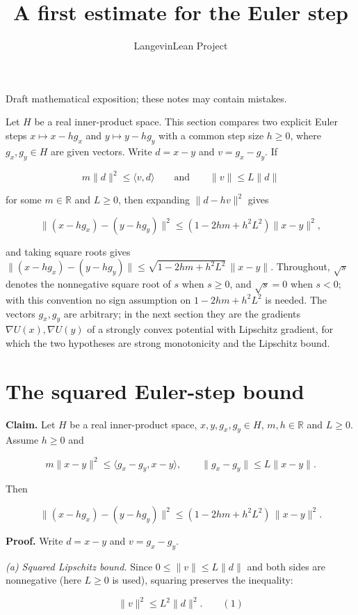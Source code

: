 \documentclass[11pt,a4paper]{article}
\title{\texorpdfstring{A first estimate for the Euler step}{A first estimate for the Euler step}}
\author{LangevinLean Project}
\date{}
\begin{document}
\maketitle
Draft mathematical exposition; these notes may contain mistakes.


Let \(H\) be a real inner-product space. This section compares two explicit Euler steps \(x\mapsto x-hg_x\) and \(y\mapsto y-hg_y\) with a common step size \(h\ge0\), where \(g_x,g_y\in H\) are given vectors. Write \(d=x-y\) and \(v=g_x-g_y\). If


\[m\|d\|^2\le\langle v,d\rangle\qquad\text{and}\qquad\|v\|\le L\|d\|\]


for some \(m\in\mathbb R\) and \(L\ge0\), then expanding \(\|d-hv\|^2\) gives


\[\|(x-hg_x)-(y-hg_y)\|^2\le(1-2hm+h^2L^2)\|x-y\|^2,\]


and taking square roots gives \(\|(x-hg_x)-(y-hg_y)\|\le\sqrt{1-2hm+h^2L^2}\,\|x-y\|\). Throughout, \(\sqrt s\) denotes the nonnegative square root of \(s\) when \(s\ge0\), and \(\sqrt s=0\) when \(s<0\); with this convention no sign assumption on \(1-2hm+h^2L^2\) is needed. The vectors \(g_x,g_y\) are arbitrary; in the next section they are the gradients \(\nabla U(x),\nabla U(y)\) of a strongly convex potential with Lipschitz gradient, for which the two hypotheses are strong monotonicity and the Lipschitz bound.


\section{\texorpdfstring{The squared Euler-step bound}{The squared Euler-step bound}}


\textbf{Claim.} Let \(H\) be a real inner-product space, \(x,y,g_x,g_y\in H\), \(m,h\in\mathbb R\) and \(L\ge0\). Assume \(h\ge0\) and


\[m\|x-y\|^2\le\langle g_x-g_y,x-y\rangle,\qquad\|g_x-g_y\|\le L\|x-y\|.\]


Then


\[\|(x-hg_x)-(y-hg_y)\|^2\le(1-2hm+h^2L^2)\,\|x-y\|^2.\]


\textbf{Proof.} Write \(d=x-y\) and \(v=g_x-g_y\).




\emph{(a) Squared Lipschitz bound.} Since \(0\le\|v\|\le L\|d\|\) and both sides are nonnegative (here \(L\ge0\) is used), squaring preserves the inequality:


\[\|v\|^2\le L^2\|d\|^2.\qquad(1)\]
\end{document}
